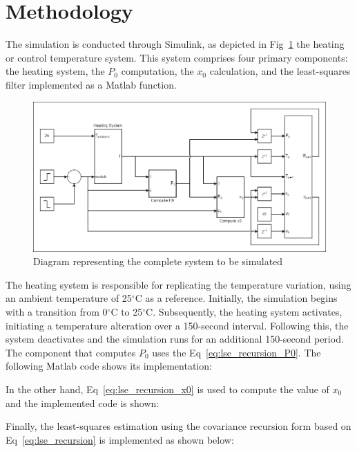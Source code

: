 \section{Methodology}
The simulation is conducted through Simulink, as depicted in Fig~\ref{fig:heat_system_diagram} the heating or control temperature system. This system comprises four primary components: the heating system, the $P_{0}$ computation, the $x_{0}$ calculation, and the least-squares filter implemented as a Matlab function.

\begin{figure}[H]
    \centering
    \includegraphics[width=1\linewidth]{figures/heat_system_diagram.png}
    \caption{Diagram representing the complete system to be simulated}
    \label{fig:heat_system_diagram}
\end{figure}

The heating system is responsible for replicating the temperature variation, using an ambient temperature of 25$^{\circ}$C as a reference. Initially, the simulation begins with a transition from 0$^{\circ}$C to 25$^{\circ}$C. Subsequently, the heating system activates, initiating a temperature alteration over a 150-second interval. Following this, the system deactivates and the simulation runs for an additional 150-second period. \\

The component that computes $P_{0}$ uses the Eq~\ref{eq:lse_recursion_P0}. The following Matlab code shows its implementation:



In the other hand, Eq~\ref{eq:lse_recursion_x0} is used to compute the value of $x_{0}$ and the implemented code is shown:



Finally, the least-squares estimation using the covariance recursion form based on Eq~\ref{eq:lse_recursion} is implemented as shown below:

